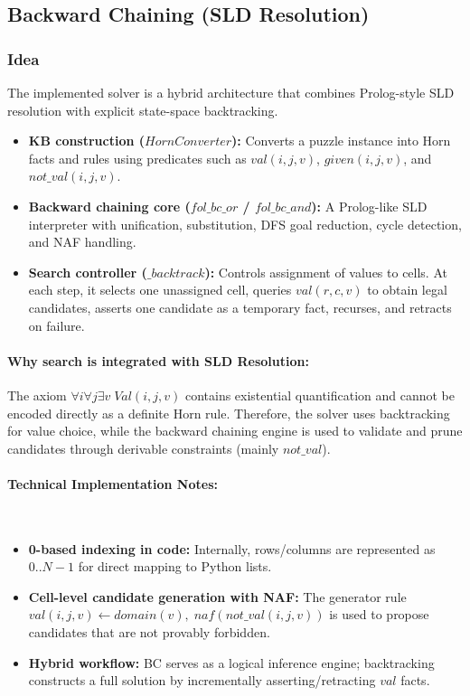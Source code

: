 \subsection{Backward Chaining (SLD Resolution)}

\subsubsection{Idea}
The implemented solver is a hybrid architecture that combines Prolog-style SLD resolution with explicit state-space backtracking.
\begin{itemize}
    \item \textbf{KB construction ($HornConverter$):} Converts a puzzle instance into Horn facts and rules using predicates such as $val(i,j,v)$, $given(i,j,v)$, and $not\_val(i,j,v)$.
    \item \textbf{Backward chaining core ($fol\_bc\_or$ / $fol\_bc\_and$):} A Prolog-like SLD interpreter with unification, substitution, DFS goal reduction, cycle detection, and NAF handling.
    \item \textbf{Search controller ($\_backtrack$):} Controls assignment of values to cells. At each step, it selects one unassigned cell, queries $val(r,c,v)$ to obtain legal candidates, asserts one candidate as a temporary fact, recurses, and retracts on failure.
\end{itemize}

\paragraph{Why search is integrated with SLD Resolution:}
The axiom $\forall i\forall j\exists v\;Val(i,j,v)$ contains existential quantification and cannot be encoded directly as a definite Horn rule. Therefore, the solver uses backtracking for value choice, while the backward chaining engine is used to validate and prune candidates through derivable constraints (mainly $not\_val$).

\paragraph{Technical Implementation Notes:}~
\begin{itemize}
    \item \textbf{0-based indexing in code:} Internally, rows/columns are represented as $0..N-1$ for direct mapping to Python lists.
    \item \textbf{Cell-level candidate generation with NAF:} The generator rule $val(i,j,v) \leftarrow domain(v),\; naf(not\_val(i,j,v))$ is used to propose candidates that are not provably forbidden.
    \item \textbf{Hybrid workflow:} BC serves as a logical inference engine; backtracking constructs a full solution by incrementally asserting/retracting $val$ facts.
\end{itemize}

